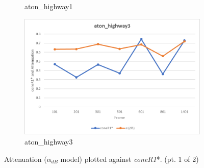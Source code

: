 \begin{appendices}
\begin{figure}
\begin{subfigure}{.45\linewidth}
  \caption{aton\_highway1}
\end{subfigure}
\hfill
\begin{subfigure}{.45\linewidth}
  \includegraphics[width=1\linewidth]{figures/appendix/highway3_db.jpg}
  \caption{aton\_highway3}
\end{subfigure}

\caption{Attenuation ($\alpha_{dB}$ model) plotted against \textit{coneR1}*. (pt. 1 of 2)}
\end{figure}


\end{appendices}
